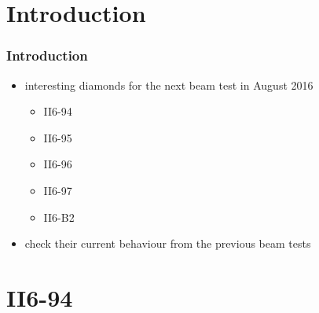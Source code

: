 \documentclass[9pt]{beamer}
\begin{document}
\section{Introduction}
\begin{frame}
	\frametitle{Introduction}
	\begin{minipage}[c][.7\textheight]{6cm}
		\begin{itemize}
			\setlength{\itemsep}{\fill}
			\item interesting diamonds for the next beam test in August 2016
			\begin{itemize}
				\item II6-94
				\item II6-95
				\item II6-96
				\item II6-97
				\item II6-B2
			\end{itemize}
			\item check their current behaviour from the previous beam tests
		\end{itemize}
	\end{minipage}
\end{frame}
\section{II6-94}
\end{document}
